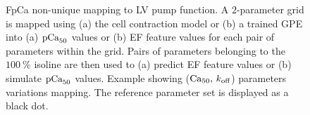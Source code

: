 


\begin{figure}[ht!]
    \myfloatalign
    \quad
    \caption{FpCa non-unique mapping to LV pump function. A $2$-parameter grid is mapped using (a) the cell contraction model or (b) a trained GPE into (a) $\textrm{pCa}_{50}$ values or (b) EF feature values for each pair of parameters within the grid. Pairs of parameters belonging to the $\SI{100}{\percent}$ isoline are then used to (a) predict EF feature values or (b) simulate $\textrm{pCa}_{50}$ values. Example showing ($\textrm{Ca}_{50},\,k_{\textrm{off}}$) parameters variations mapping. The reference parameter set is displayed as a black dot.}\label{fig:twoparamssamefeatdifffpca}
\end{figure}

